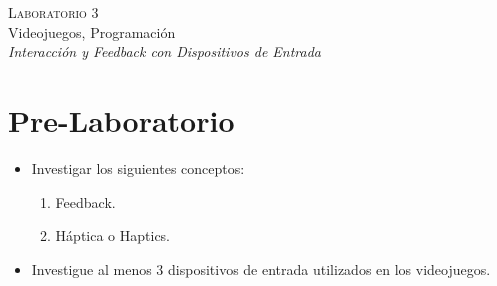 \begin{center}
\textsc{\Large Laboratorio 3}~\\
{\large Videojuegos, Programación}~\\
\emph{Interacción y \emph{Feedback} con Dispositivos de Entrada}
\end{center}

\section{Pre-Laboratorio}
\begin{itemize}
\item Investigar los siguientes conceptos:
\begin{enumerate}
  \item Feedback.
  \item Háptica o Haptics.
\end{enumerate}
\item Investigue al menos 3 dispositivos de entrada utilizados en los videojuegos.
\end{itemize}

